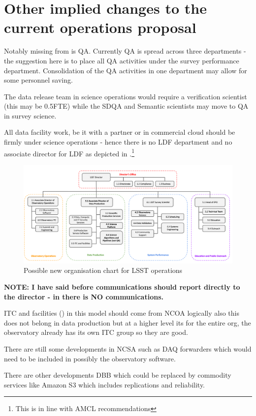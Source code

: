 


\section{Other implied changes to the current operations proposal}
Notably missing from  is \gls{QA}. Currently \gls{QA} is spread across  three
 departments - the suggestion here is to place all \gls{QA} activities under the survey performance department. Consolidation
of the \gls{QA} activities in one department may allow for some personnel saving.

The data release team in science operations would require a verification scientist (this may be 0.5FTE) while the \gls{SDQA} and Semantic scientists may move to QA in survey science.

All data facility work, be it with a partner or in commercial \gls{cloud} should be firmly under science operations - hence there is no \gls{LDF} department and no associate director for \gls{LDF} as depicted in .\footnote{This is  in line with AMCL recommendations}


\begin{figure}
\includegraphics[width=1.0\textwidth]{figures/OpsOrg}
\caption{Possible new organisation chart for \gls{LSST}  operations \label{fig:opsorg}}
\end{figure}

\textbf{NOTE: I have said before communications should report directly to the director - in  there is NO communications.}

ITC and facilities () in this model should come from \gls{NCOA}  logically also this does not belong in data production but at a higher level its for the entire org, the observatory already has its own \gls{ITC} group so they are good.


There are still some developments in \gls{NCSA} such as \gls{DAQ} forwarders which would need to be included in possibly the observatory \gls{software}.

There are other developments \gls{DBB} which could be replaced by commodity services like Amazon \gls{S3} which includes replications and reliability.

